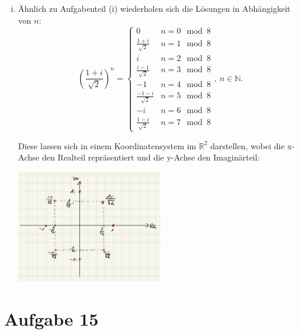 \documentclass[12pt,a4paper]{article}
\begin{document}
\begin{enumerate}[(i)]
    \item Ähnlich zu Aufgabenteil (i) wiederholen sich die Lösungen in Abhängigkeit von $n$:
    $$\left(\frac{1+i}{\sqrt{2}}\right)^n = \left\lbrace\begin{matrix}
    0 & n = 0 \mod 8\\
    \frac{1+i}{\sqrt{2}} & n = 1 \mod 8\\
    i & n = 2 \mod 8\\
    \frac{i-1}{\sqrt{2}} & n = 3 \mod 8\\
    -1 & n = 4 \mod 8\\
    \frac{-1-i}{\sqrt{2}} & n = 5 \mod 8\\
    -i & n = 6 \mod 8\\
    \frac{1-i}{\sqrt{2}} & n = 7 \mod 8
    \end{matrix}\right.,\ n \in \mathbb{N}.$$

    Diese lassen sich in einem Koordinatensystem im $\mathbb{R}^2$ darstellen, wobei die x-Achse den Realteil repräsentiert und die y-Achse den Imaginärteil:

    \begin{minipage}{\linewidth}
        \centering
        \includegraphics[width=0.5\textwidth]{a14v.jpg}
        \label{fig:a14v}
    \end{minipage}
\end{enumerate}


\section*{Aufgabe 15}
\end{document}
